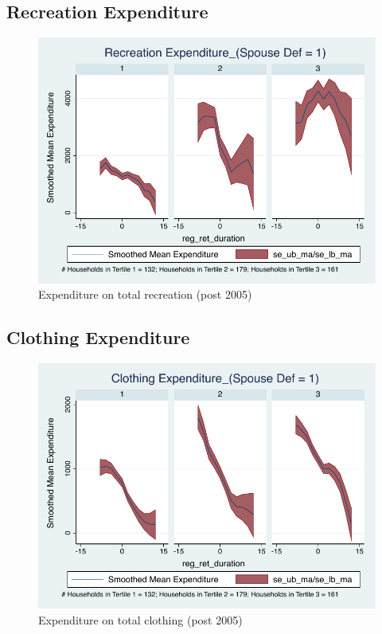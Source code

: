 \documentclass[a4paper]{article}
\begin{document}
\subsection{Recreation Expenditure}
\begin{table}[h]
	\centering
	
\end{table}

\begin{figure}[h]
	\caption{Expenditure on total recreation (post 2005)}
	\centering
	\includegraphics[width=1.0\textwidth]{../ConsumptionPostRetirement_by_SpouseDef_Cats/Smoothed/1/spouse_def_total_recreation_2005_real.pdf}
\end{figure}

\clearpage

\subsection{Clothing Expenditure}
\begin{table}[h]
	\centering
	
\end{table}

\begin{figure}[h]
	\caption{Expenditure on total clothing (post 2005)}
	\centering
	\includegraphics[width=1.0\textwidth]{../ConsumptionPostRetirement_by_SpouseDef_Cats/Smoothed/1/spouse_def_total_clothing_2005_real.pdf}
\end{figure}

\clearpage
\end{document}
